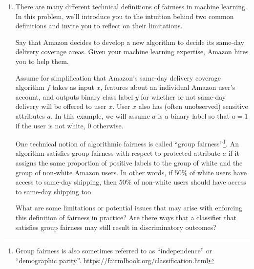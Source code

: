 \documentclass[submit]{harvardml}
\begin{document}
\begin{problem}
\begin{enumerate}
    
    \item There are many different technical definitions of fairness in machine learning.  In this problem, we'll introduce you to the intuition behind two common definitions and invite you to reflect on their limitations. 
     
    Say that Amazon decides to develop a new algorithm to decide its same-day delivery coverage areas.  Given your machine learning expertise, Amazon hires you to help them.
    
    Assume for simplification that Amazon's same-day delivery coverage algorithm $f$ takes as input $x$, features about an individual Amazon user's account, and outputs binary class label $y$ for whether or not same-day delivery will be offered to user $x$.  User $x$ also has (often unobserved) sensitive attributes $a$.  In this example, we will assume $a$ is a binary label so that $a = 1$ if the user is not white, $0$ otherwise.
    
    One technical notion of algorithmic fairness is called ``group fairness''\footnote{ Group fairness is also sometimes referred to as ``independence'' or ``demographic parity''.  https://fairmlbook.org/classification.html}. An algorithm satisfies group fairness with respect to protected attribute $a$ if it assigns the same proportion of positive labels to the group of white and the group of non-white Amazon users.  In other words, if 50\% of white users have access to same-day shipping, then 50\% of non-white users should have access to same-day shipping too.
    
    What are some limitations or potential issues that may arise with enforcing this definition of fairness in practice?  Are there ways that a classifier that satisfies group fairness may still result in discriminatory outcomes?
    

\end{enumerate}
\end{problem}
\end{document}
